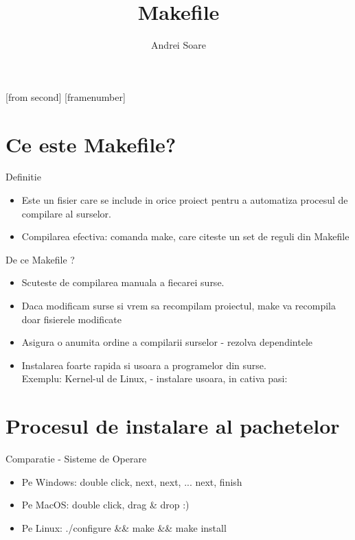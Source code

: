 \documentclass{beamer}
\title[Makefile]{Makefile}
\institute{ROSEdu}
\author{Andrei Soare}
\begin{document}
[from second]
[framenumber]

\frame{\titlepage}

\frame{\tableofcontents}

\section{Ce este Makefile?}
    \frame{\tableofcontents[currentsection]}
    
    \begin{frame}{Definitie}
    \begin{itemize}
    \setlength{\itemsep}{0.8cm}
    \item Este un fisier care se include in orice proiect pentru a automatiza procesul de compilare al surselor.\\
    \item Compilarea efectiva: comanda make, care citeste un set de reguli din Makefile
    \end{itemize}
    \end{frame}

    \begin{frame}{De ce Makefile ?}
    \begin{itemize}
    \setlength{\itemsep}{0.4cm}
    \item Scuteste de compilarea manuala a fiecarei surse.
    \item Daca modificam surse si vrem sa recompilam proiectul, make va recompila doar fisierele modificate
    \item Asigura o anumita ordine a compilarii surselor - rezolva dependintele
    \item Instalarea foarte rapida si usoara a programelor din surse.\\Exemplu: Kernel-ul de Linux, - instalare usoara, in cativa pasi:\\\vspace{0.2cm}
    \end{itemize}
    \end{frame}

\section{Procesul de instalare al pachetelor}
    \frame{\tableofcontents[currentsection]}

    \begin{frame}{Comparatie - Sisteme de Operare}
    \begin{itemize}
    \setlength{\itemsep}{0.5cm}
    \item Pe Windows: double click, next, next, ... next, finish
    \item Pe MacOS: double click, drag \& drop :)
    \item Pe Linux: \ttfamily./configure \&\& make \&\& make install\normalfont
    \end{itemize}
    \end{frame}
\end{document}
